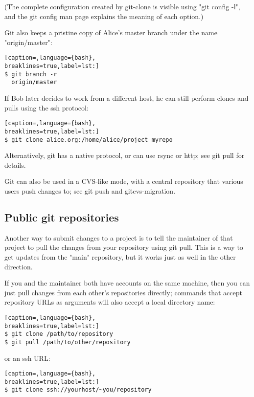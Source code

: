 (The complete configuration created by git-clone is visible using "git config
-l", and the git config man page explains the meaning of each option.)

Git also keeps a pristine copy of Alice's master branch under the name
"origin/master":
\lstset{basicstyle=\scriptsize, numbers=none, captionpos=b, tabsize=4}
\begin{lstlisting}[caption=,language={bash},
breaklines=true,label=lst:]
$ git branch -r
  origin/master
\end{lstlisting}

If Bob later decides to work from a different host, he can still perform clones
and pulls using the ssh protocol:
\lstset{basicstyle=\scriptsize, numbers=none, captionpos=b, tabsize=4}
\begin{lstlisting}[caption=,language={bash},
breaklines=true,label=lst:]
$ git clone alice.org:/home/alice/project myrepo
\end{lstlisting}

Alternatively, git has a native protocol, or can use rsync or http; see git
pull for details.

Git can also be used in a CVS-like mode, with a central repository that various
users push changes to; see git push and gitcvs-migration.

\subsection{Public git repositories}

Another way to submit changes to a project is to tell the maintainer of that
project to pull the changes from your repository using git pull. This is a way
to get updates from the "main" repository, but it works just as well in the
other direction.

If you and the maintainer both have accounts on the same machine, then you can
just pull changes from each other's repositories directly; commands that accept
repository URLs as arguments will also accept a local directory name:
\lstset{basicstyle=\scriptsize, numbers=none, captionpos=b, tabsize=4}
\begin{lstlisting}[caption=,language={bash},
breaklines=true,label=lst:]
$ git clone /path/to/repository
$ git pull /path/to/other/repository
\end{lstlisting}

or an ssh URL:
\lstset{basicstyle=\scriptsize, numbers=none, captionpos=b, tabsize=4}
\begin{lstlisting}[caption=,language={bash},
breaklines=true,label=lst:]
$ git clone ssh://yourhost/~you/repository
\end{lstlisting}

